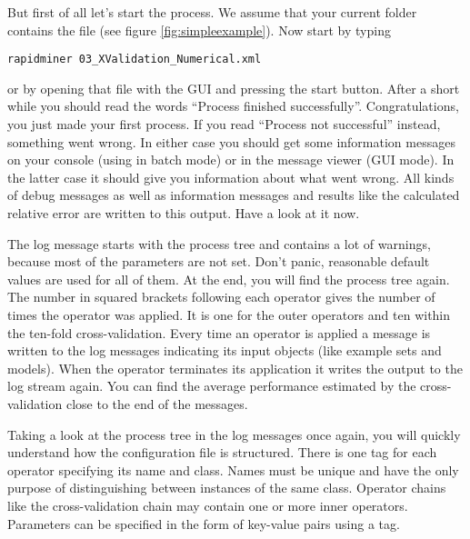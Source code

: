 
But first of all let's start the process. We assume that your
current folder contains the file  (see
figure \ref{fig:simpleexample}). Now start \rapidminer by typing
\begin{verbatim}
rapidminer 03_XValidation_Numerical.xml
\end{verbatim}
or by opening that file with the
GUI and pressing the start button. After a short while you should
read the words ``Process finished successfully''. Congratulations,
you just made your first \rapidminer process. If you read ``Process
not successful'' instead, something went wrong. In either case you
should get some information messages on your console (using \rapidminer in batch mode) or
in the message viewer (GUI mode). In the latter case it should give
you information about what went wrong. All kinds of debug messages as
well as information messages and results like the calculated relative
error are written to this output. Have a look at it now.

The log message starts with the process tree and contains a lot of
warnings, because most of the parameters are not set. Don't panic,
reasonable default values are used for all of them. At the end, you will
find the process tree again. The number in squared brackets
following each operator gives the number of times the operator was
applied. It is one for the outer operators and ten within the ten-fold
cross-validation. Every time an operator is applied a message is written
to the log messages indicating its input objects (like example sets and
models). When the operator terminates its application it writes the
output to the log stream again. You can find the average performance
estimated by the cross-validation close to the end of the messages.

Taking a look at the process tree in the log messages once again, you
will quickly understand how the configuration file is structured. 
There is one  tag for each operator specifying its 
name and class. Names must be unique and have the only purpose of 
distinguishing between instances of the same class.
Operator chains like the cross-validation chain may contain one 
or more inner operators. Parameters can be specified in the form of
key-value pairs using a  tag.

